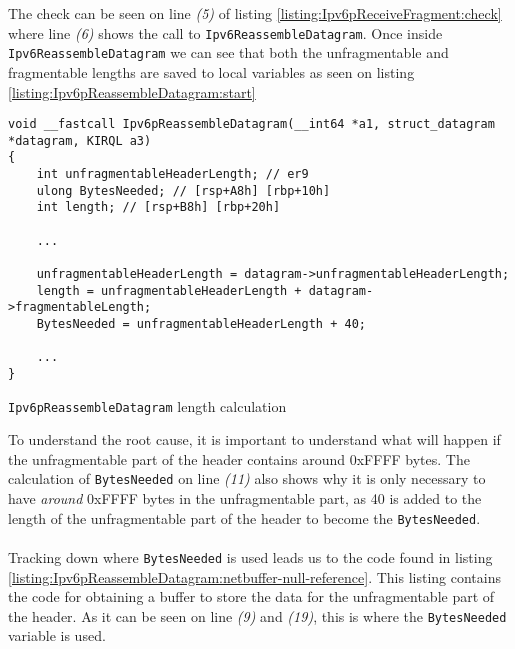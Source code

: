 \documentclass{report}
\begin{document}
The check can be seen on line \emph{(5)} of listing \ref{listing:Ipv6pReceiveFragment:check} where line \emph{(6)} shows the call to \texttt{Ipv6ReassembleDatagram}. Once inside \texttt{Ipv6ReassembleDatagram} we can see that both the unfragmentable and fragmentable lengths are saved to local variables as seen on listing \ref{listing:Ipv6pReassembleDatagram:start}

\begin{listing}[H]
\begin{verbatim}
void __fastcall Ipv6pReassembleDatagram(__int64 *a1, struct_datagram *datagram, KIRQL a3)
{
    int unfragmentableHeaderLength; // er9
    ulong BytesNeeded; // [rsp+A8h] [rbp+10h]
    int length; // [rsp+B8h] [rbp+20h]

    ...

    unfragmentableHeaderLength = datagram->unfragmentableHeaderLength;
    length = unfragmentableHeaderLength + datagram->fragmentableLength;
    BytesNeeded = unfragmentableHeaderLength + 40;

    ...
}
\end{verbatim}
\caption{\texttt{Ipv6pReassembleDatagram} length calculation}
\label{listing:Ipv6pReassembleDatagram:start}
\end{listing}

To understand the root cause, it is important to understand what will happen if the unfragmentable part of the header contains around 0xFFFF bytes. The calculation of \texttt{BytesNeeded} on line \emph{(11)} also shows why it is only necessary to have \emph{around} 0xFFFF bytes in the unfragmentable part, as 40 is added to the length of the unfragmentable part of the header to become the \texttt{BytesNeeded}.
\\
\\
Tracking down where \texttt{BytesNeeded} is used leads us to the code found in listing \ref{listing:Ipv6pReassembleDatagram:netbuffer-null-reference}. This listing contains the code for obtaining a buffer to store the data for the unfragmentable part of the header. As it can be seen on line \emph{(9)} and \emph{(19)}, this is where the \texttt{BytesNeeded} variable is used.
\end{document}
